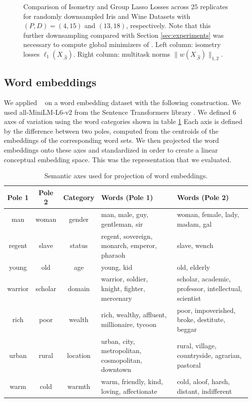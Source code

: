 \begin{figure}[t]
    \caption{Comparison of Isometry and Group Lasso Losses across $25$ replicates for randomly downsampled Iris and Wine Datasets with $(P,D) = (4,15)$ and $(13, 18)$, respectively.
    Note that this further downsampling compared with Section \ref{sec:experiments} was necessary to compute global minimizers of \brute.
    Left column: isometry losses $\ell_1(X_{.\widehat{S}})$. Right column: multitask norms $\|w(X_{.\widehat{S}})\|_{1,2}$.
    }
    \label{fig:ecdf_comparison_losses}
\end{figure}

\newpage

\subsection{Word embeddings}
\label{sec:word_embeddings}

We applied \isometrypursuit~ on a word embedding dataset with the following construction.
We used all-MiniLM-L6-v2 from the Sentence Transformers library \citep{reimers-2019-sentence-bert}.
We defined $6$ axes of variation using the word categories shown in table \ref{tab:semantic_axes}
Each axis is defined by the difference between two poles, computed from the centroids of the embeddings of the corresponding word sets.
We then projected the word embeddings onto these axes and standardized in order to create a linear conceptual embedding space.
This was the representation that we evaluated.

\begin{table}[t]
\centering
\begin{tabular}{|c|c|c|p{5cm}|p{5cm}|}
\hline
\textbf{Pole 1} & \textbf{Pole 2} & \textbf{Category} & \textbf{Words (Pole 1)} & \textbf{Words (Pole 2)} \\
\hline
man     & woman     & gender   & man, male, guy, gentleman, sir & woman, female, lady, madam, gal \\
regent  & slave     & status   & regent, sovereign, monarch, emperor, pharaoh & slave, wench \\
young   & old       & age      & young, kid & old, elderly \\
warrior & scholar   & domain   & warrior, soldier, knight, fighter, mercenary & scholar, academic, professor, intellectual, scientist \\
rich    & poor      & wealth   & rich, wealthy, affluent, millionaire, tycoon & poor, impoverished, broke, destitute, beggar \\
urban   & rural     & location & urban, city, metropolitan, cosmopolitan, downtown & rural, village, countryside, agrarian, pastoral \\
warm    & cold      & warmth   & warm, friendly, kind, loving, affectionate & cold, aloof, harsh, distant, indifferent \\
\hline
\end{tabular}
\caption{Semantic axes used for projection of word embeddings. }
\label{tab:semantic_axes}
\end{table}

